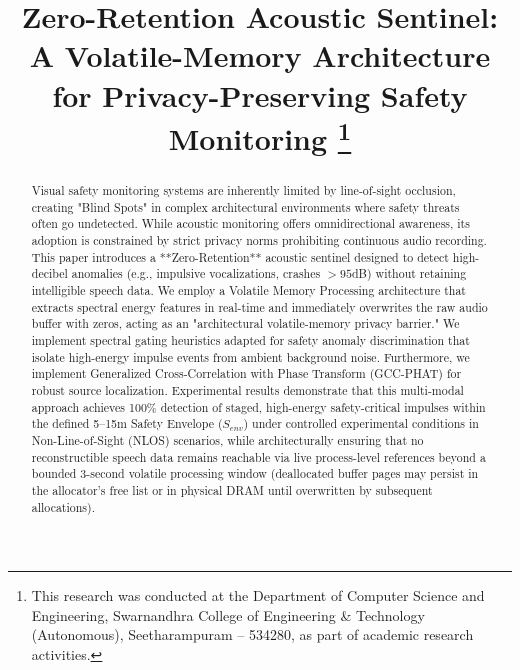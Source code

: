 \documentclass[conference]{IEEEtran}
\begin{document}
\title{Zero-Retention Acoustic Sentinel: A Volatile-Memory Architecture for Privacy-Preserving Safety Monitoring
\thanks{This research was conducted at the Department of Computer Science and Engineering, Swarnandhra College of Engineering \& Technology (Autonomous), Seetharampuram – 534280, as part of academic research activities.}
}

\author{
}

\maketitle

\begin{abstract}
Visual safety monitoring systems are inherently limited by line-of-sight occlusion, creating "Blind Spots" in complex architectural environments where safety threats often go undetected. While acoustic monitoring offers omnidirectional awareness, its adoption is constrained by strict privacy norms prohibiting continuous audio recording. This paper introduces a **Zero-Retention** acoustic sentinel designed to detect high-decibel anomalies (e.g., impulsive vocalizations, crashes $>95$dB) without retaining intelligible speech data. We employ a Volatile Memory Processing architecture that extracts spectral energy features in real-time and immediately overwrites the raw audio buffer with zeros, acting as an "architectural volatile-memory privacy barrier." We implement spectral gating heuristics adapted for safety anomaly discrimination that isolate high-energy impulse events from ambient background noise. Furthermore, we implement Generalized Cross-Correlation with Phase Transform (GCC-PHAT) for robust source localization. Experimental results demonstrate that this multi-modal approach achieves 100\% detection of staged, high-energy safety-critical impulses within the defined 5--15m Safety Envelope ($S_{env}$) under controlled experimental conditions in Non-Line-of-Sight (NLOS) scenarios, while architecturally ensuring that no reconstructible speech data remains reachable via live process-level references beyond a bounded 3-second volatile processing window (deallocated buffer pages may persist in the allocator's free list or in physical DRAM until overwritten by subsequent allocations).
\end{abstract}
\end{document}
